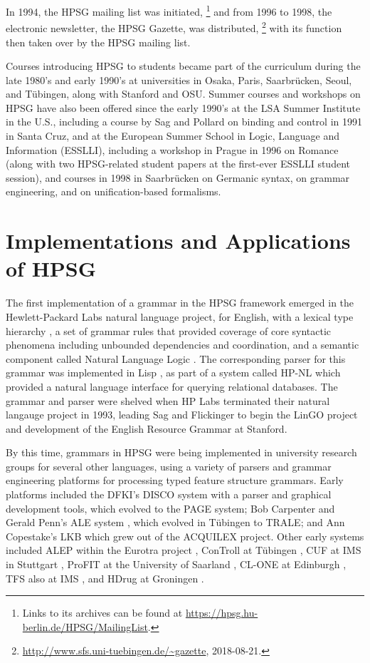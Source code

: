 \documentclass[output=paper]{langsci/langscibook}
\begin{document}
In 1994, the HPSG mailing list was initiated, \footnote{Links to its archives can be found at
  \url{https://hpsg.hu-berlin.de/HPSG/MailingList}.} and from 1996 to 1998, the electronic
newsletter, the HPSG Gazette, was
distributed, \footnote{\url{http://www.sfs.uni-tuebingen.de/~gazette}, 2018-08-21.} with its function then taken over by the HPSG mailing list.

Courses introducing HPSG to students became part of the curriculum during the late 1980's and early 1990's at universities in Osaka, Paris, Saarbr{\"u}cken, Seoul, and T{\"u}bingen, along with Stanford and OSU.  Summer courses and workshops on HPSG have also been offered since the early 1990's at the LSA Summer Institute in the U.S., including a course by Sag and Pollard on binding and control in 1991 in Santa Cruz, and at the European Summer School in Logic, Language and Information (ESSLLI), including a workshop in Prague in 1996 on Romance (along with two HPSG-related student papers at the first-ever ESSLLI student session), and courses in 1998 in Saarbr{\"u}cken on Germanic syntax, on grammar engineering, and on unification-based formalisms.
    

\section{Implementations and Applications of HPSG}

The first implementation of a grammar in the HPSG framework emerged in the Hewlett-Packard Labs natural language project, for English, with a lexical type hierarchy \citep{FPW85a}, a set of grammar rules that provided coverage of core syntactic phenomena including unbounded dependencies and coordination, and a semantic component called Natural Language Logic \citep{LaubNerb1991}.  The corresponding parser for this grammar was implemented in Lisp \citep{PP85}, as part of a system called HP-NL \citep{NerProud1987} which provided a natural language interface for querying relational databases.  The grammar and parser were shelved when HP Labs terminated their natural langauge project in 1993, leading Sag and Flickinger to begin the LinGO project and development of the English Resource Grammar at Stanford.

By this time, grammars in HPSG were being implemented in university research groups for several other languages, using a variety of parsers and grammar engineering platforms for processing typed feature structure grammars.  Early platforms included the DFKI's DISCO system \citep{DISCO94} with a parser and graphical development tools, which evolved to the PAGE system; Bob Carpenter and Gerald Penn's ALE system \citep{CP96}, which evolved in T{\"u}bingen to TRALE; and Ann Copestake's LKB \citep{Copestake2002a-Short} which grew out of the ACQUILEX project.  Other early systems included ALEP within the Eurotra project \citep{SimpGron1994}, ConTroll at T{\"u}bingen \citep{GoetzMeurers1997}, CUF at IMS in Stuttgart \citep{DD93a-u}, ProFIT at the University of Saarland \citep{Erbach95a}, CL-ONE at Edinburgh \citep{Manandhar1994}, TFS also at IMS \citep{Emele94a-u}, and HDrug at Groningen \citep{NB97b-u}.  
\end{document}

